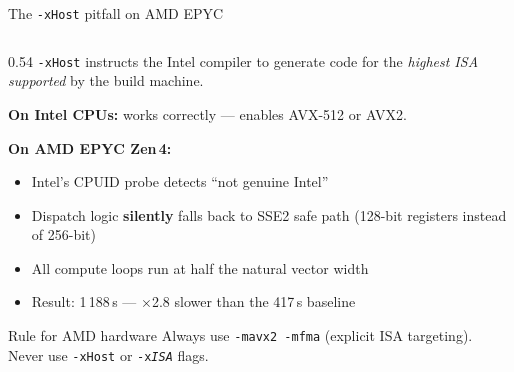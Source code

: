 \documentclass[aspectratio=169,10pt]{beamer}
\begin{document}
\begin{frame}[shrink=12]{The \texttt{-xHost} pitfall on AMD EPYC}

  \begin{columns}[T]
    \begin{column}{0.54\textwidth}
      \texttt{-xHost} instructs the Intel compiler to generate code for the
      \emph{highest ISA supported} by the build machine.

      \vspace{0.5em}
      \textbf{On Intel CPUs:} works correctly --- enables AVX-512 or AVX2.

      \vspace{0.4em}
      \textbf{On AMD EPYC Zen\,4:}
      \begin{itemize}
        \item Intel's CPUID probe detects ``not genuine Intel''
        \item Dispatch logic \textbf{silently} falls back to SSE2 safe path
              (128-bit registers instead of 256-bit)
        \item All compute loops run at half the natural vector width
        \item \alert{Result: 1\,188\,s --- $\times$2.8 slower than the 417\,s baseline}
      \end{itemize}

      \vspace{0.3em}
      \begin{alertblock}{Rule for AMD hardware}
        Always use \texttt{-mavx2 -mfma} (explicit ISA targeting).\\
        Never use \texttt{-xHost} or \texttt{-x\textit{ISA}} flags.
      \end{alertblock}
    \end{column}


\end{columns}
\end{frame}
\end{document}

